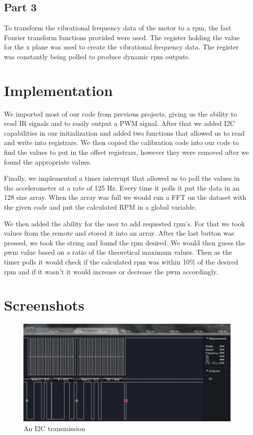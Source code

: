 \documentclass[11pt, titlepage]{article}
\begin{document}
        \subsection{Part 3}
            To transform the vibrational frequency data of the motor to a rpm, the fast Fourier transform functions provided were used. The register holding the value for the x plane was used to create the vibrational frequency data. The register was constantly being polled to produce dynamic rpm outputs.
    \section{Implementation}
        We imported most of our code from previous projects, giving us the ability to read IR signals and to easily output a PWM signal.  After that we added I2C capabilities in our initialization and added two functions that allowed us to read and write into registrars. We then copied the calibration code into our code to find the values to put in the offset registrars, however they were removed after we found the appropriate values.

    \vspace{0.5cm}
    Finally, we implemented a timer interrupt that allowed us to poll the values in the accelerometer at a rate of 125 Hz.  Every time it polls it put the data in an 128 size array.  When the array was full we would run a FFT on the dataset with the given code and put the calculated RPM in a global variable.  

    \vspace{0.5cm}
    We then added the ability for the user to add requested rpm's.  For that we  took values from the remote and stored it into an array.  After the last button was pressed, we took the string and found the rpm desired.  We would then guess the pwm value based on a ratio of the theoretical maximum values.  Then as the timer polls it would check if the calculated rpm was within 10\% of the desired rpm and if it wasn't it would increase or decrease the pwm accordingly. 
    \section{Screenshots}
        \FloatBarrier
        \begin{figure}[htbp]
            \centering
            \includegraphics[scale=0.5]{Screenshot/I2C.jpg}
            \caption{An I2C transmission}
        \end{figure}
        \FloatBarrier
        
\end{document}
